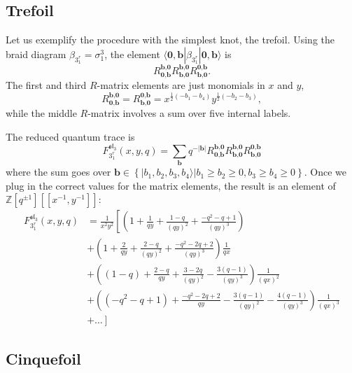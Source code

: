\documentclass[12pt,oneside,reqno]{amsart}
\numberwithin{teorema}{section}
\numberwithin{definicion}{section}
\numberwithin{lema}{section}
\numberwithin{conjetura}{section}
\numberwithin{proposicion}{section}
\def\sl{\mathfrak{sl}}
\begin{document}
\subsection{Trefoil}

Let us exemplify the procedure with the simplest knot, the trefoil. Using the braid diagram $\beta_{3_1^{r}}=\sigma_1^3$, the element $\langle \textbf{0},\textbf{b}|\beta_{3_1^{r}}|\textbf{0},\textbf{b}\rangle$ is
$$R_{\textbf{0},\textbf{b}}^{\textbf{b},\textbf{0}}R_{\textbf{b},\textbf{0}}^{\textbf{b},\textbf{0}}R_{\textbf{b},\textbf{0}}^{\textbf{0},\textbf{b}}.$$
The first and third $R$-matrix elements are just monomials in $x$ and $y$,
$$R_{\textbf{0},\textbf{b}}^{\textbf{b},\textbf{0}} = R_{\textbf{b},\textbf{0}}^{\textbf{0},\textbf{b}} = x^{\frac{1}{2}(-b_1-b_4)}y^{\frac{1}{2}(-b_2-b_3)},$$
while the middle $R$-matrix involves a sum over five internal labels.

The reduced quantum trace is
\begin{equation}
    F_{3_1^{r}}^{\sl_3}(x,y,q) = \sum_{\textbf{b}} q^{-|\textbf{b}|} R_{\textbf{0},\textbf{b}}^{\textbf{b},\textbf{0}}R_{\textbf{b},\textbf{0}}^{\textbf{b},\textbf{0}}R_{\textbf{b},\textbf{0}}^{\textbf{0},\textbf{b}}
\end{equation}
where the sum goes over $\textbf{b}\in\left\{|b_1,b_2,b_3,b_4\rangle | b_1\geq b_2\geq 0, b_3\geq b_4\geq 0\right\}$. Once we plug in the correct values for the matrix elements, the result is an element of $\mathbb{Z}[q^{\pm 1}][[x^{-1},y^{-1}]]$:
\begin{equation}\label{eq:trefoil-1}
\begin{split}
    F_{3_1^{r}}^{\sl_3}(x,y,q)&=\frac{1}{x^2y^2}\left[\left(1+\frac{1}{qy}+\frac{1-q}{(qy)^2}+\frac{-q^2-q+1 }{(qy)^3}\right)\right.
    \\&+\left(1+\frac{2}{qy}+\frac{2-q}{(qy)^2}+\frac{-q^2-2 q+2}{(qy)^3}\right)\frac{1}{qx}
    \\&+\left((1-q)+\frac{2-q}{qy}+\frac{3-2 q}{(qy)^2}-\frac{3 (q-1)}{(qy)^3}\right)\frac{1}{(qx)^2} 
    \\&+ \left((-q^2-q+1)+\frac{-q^2-2 q+2}{qy}-\frac{3 (q-1)}{(qy)^2}-\frac{4 (q-1)}{(qy)^3}\right)\frac{1}{(qx)^3} 
    \\&+\left.\dots\right]
\end{split}
\end{equation}

\subsection{Cinquefoil}
\end{document}
